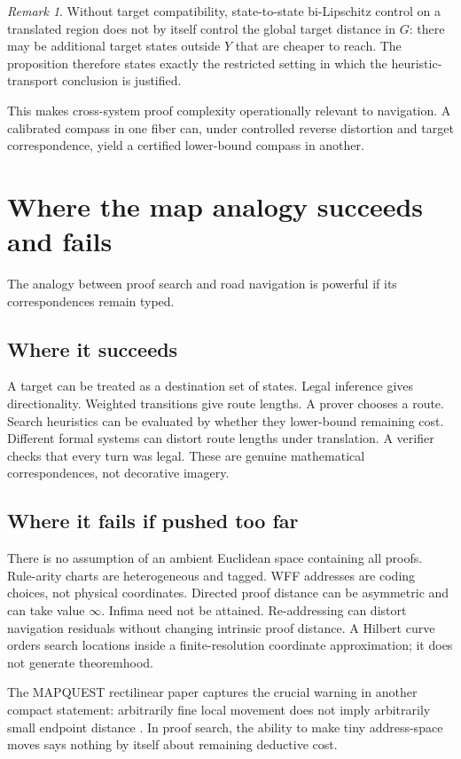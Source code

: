 \documentclass[11pt]{article}
\theoremstyle{definition}
\theoremstyle{remark}
\newtheorem{remark}[theorem]{Remark}
\begin{document}
\begin{remark}
Without target compatibility, state-to-state bi-Lipschitz control on a translated region does not by itself control the global target distance in $G$: there may be additional target states outside $Y$ that are cheaper to reach. The proposition therefore states exactly the restricted setting in which the heuristic-transport conclusion is justified.
\end{remark}

This makes cross-system proof complexity operationally relevant to navigation. A calibrated compass in one fiber can, under controlled reverse distortion and target correspondence, yield a certified lower-bound compass in another.

\section{Where the map analogy succeeds and fails}

The analogy between proof search and road navigation is powerful if its correspondences remain typed.

\subsection{Where it succeeds}
A target can be treated as a destination set of states. Legal inference gives directionality. Weighted transitions give route lengths. A prover chooses a route. Search heuristics can be evaluated by whether they lower-bound remaining cost. Different formal systems can distort route lengths under translation. A verifier checks that every turn was legal. These are genuine mathematical correspondences, not decorative imagery.

\subsection{Where it fails if pushed too far}
There is no assumption of an ambient Euclidean space containing all proofs. Rule-arity charts are heterogeneous and tagged. WFF addresses are coding choices, not physical coordinates. Directed proof distance can be asymmetric and can take value $\infty$. Infima need not be attained. Re-addressing can distort navigation residuals without changing intrinsic proof distance. A Hilbert curve orders search locations inside a finite-resolution coordinate approximation; it does not generate theoremhood.

The MAPQUEST rectilinear paper captures the crucial warning in another compact statement: arbitrarily fine local movement does not imply arbitrarily small endpoint distance \cite{MRTD}. In proof search, the ability to make tiny address-space moves says nothing by itself about remaining deductive cost.
\end{document}
